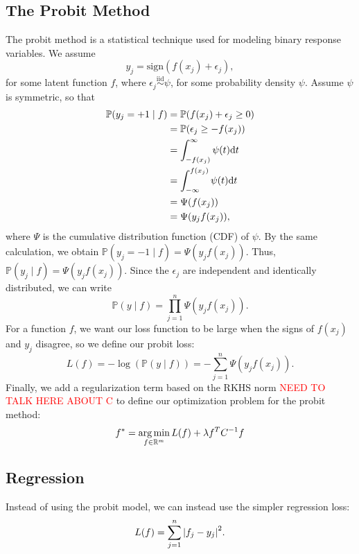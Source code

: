 \documentclass[12pt]{amsart}
\newcommand{\iid}{\overset{\mathrm{iid}}{\sim}}
\begin{document}
\subsection{The Probit Method}\label{Sec:Probit}
The probit method is a statistical technique used for modeling binary response variables. We assume
\[y_j = \mathrm{sign}(f(x_j) + \epsilon_j),\]
for some latent function $f$, where $\epsilon_j\iid \psi$, for some probability density $\psi$. Assume $\psi$ is symmetric, so that
\begin{align*}
	\mathbb{P}(y_j = +1 \mid f) &= \mathbb{P}(f(x_j) + \epsilon_j \geq 0) \\
	&= \mathbb{P}(\epsilon_j \geq - f(x_j)  ) \\
	&= \int_{-f(x_j)}^\infty \psi(t) {\mathrm{d}} t \\
	&= \int_{-\infty}^{f(x_j)} \psi(t) {\mathrm{d}} t \\
	&= \Psi(f(x_j)) \\
	&= \Psi(y_jf(x_j)),
\end{align*}
where $\Psi$ is the cumulative distribution function (CDF) of $\psi$. By the same calculation, we obtain $\mathbb{P}(y_j = -1 \mid f) = \Psi(y_jf(x_j))$. Thus, $\mathbb{P}(y_j \mid f) = \Psi(y_jf(x_j))$. Since the $\epsilon_j$ are independent and identically distributed, we can write
\[\mathbb{P}(y  \mid f) = \prod_{j = 1}^n \Psi(y_jf(x_j)).\]
For a function $f$, we want our loss function to be large when the signs of $f(x_j)$ and $y_j$  disagree, so we define our probit loss:
\[L(f) = -\log(\mathbb{P}(y\mid f)) = -\sum_{j = 1}^n \Psi(y_jf(x_j)).\]
Finally, we add a regularization term based on the RKHS norm \textcolor{red}{NEED TO TALK HERE ABOUT C} to define our optimization problem for the probit method:
\[f^* = \operatorname*{arg\,min}_{f \in \mathbb{R}^{m}} L(f) + \lambda f^{T}C^{-1}f\]

\subsection{Regression}
Instead of using the probit model, we can instead use the simpler regression loss:
\[L(f) = \sum_{j = 1}^n {\left|f_j - y_j\right|}^2.\]
\end{document}

